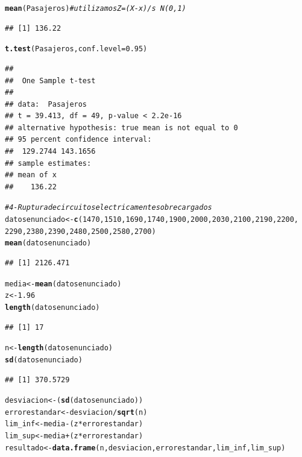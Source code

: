 \documentclass{article}\usepackage[]{graphicx}\usepackage[]{color}
\makeatletter
\newcommand{\hlnum}[1]{\textcolor[rgb]{0.686,0.059,0.569}{#1}}%
\newcommand{\hlcom}[1]{\textcolor[rgb]{0.678,0.584,0.686}{\textit{#1}}}%
\newcommand{\hlopt}[1]{\textcolor[rgb]{0,0,0}{#1}}%
\newcommand{\hlstd}[1]{\textcolor[rgb]{0.345,0.345,0.345}{#1}}%
\newcommand{\hlkwb}[1]{\textcolor[rgb]{0.69,0.353,0.396}{#1}}%
\newcommand{\hlkwc}[1]{\textcolor[rgb]{0.333,0.667,0.333}{#1}}%
\newcommand{\hlkwd}[1]{\textcolor[rgb]{0.737,0.353,0.396}{\textbf{#1}}}%
\newenvironment{kframe}{%
 \def\at@end@of@kframe{}%
 \ifinner\ifhmode%
  \def\at@end@of@kframe{\end{minipage}}%
  \begin{minipage}{\columnwidth}%
 \fi\fi%
 \def\FrameCommand##1{\hskip\@totalleftmargin \hskip-\fboxsep
 \colorbox{shadecolor}{##1}\hskip-\fboxsep
     \hskip-\linewidth \hskip-\@totalleftmargin \hskip\columnwidth}%
 \MakeFramed {\advance\hsize-\width
   \@totalleftmargin\z@ \linewidth\hsize
   \@setminipage}}%
 {\par\unskip\endMakeFramed%
 \at@end@of@kframe}
\newenvironment{knitrout}{}{} %
\makeatother
\begin{document}
\begin{knitrout}
\begin{kframe}
\begin{alltt}
\hlkwd{mean}\hlstd{(Pasajeros)} \hlcom{# utilizamos Z= (X-x)/s ~N(0,1)}
\end{alltt}
\begin{verbatim}
## [1] 136.22
\end{verbatim}
\begin{alltt}
\hlkwd{t.test}\hlstd{(Pasajeros,}\hlkwc{conf.level} \hlstd{=} \hlnum{0.95}\hlstd{)}
\end{alltt}
\begin{verbatim}
## 
## 	One Sample t-test
## 
## data:  Pasajeros
## t = 39.413, df = 49, p-value < 2.2e-16
## alternative hypothesis: true mean is not equal to 0
## 95 percent confidence interval:
##  129.2744 143.1656
## sample estimates:
## mean of x 
##    136.22
\end{verbatim}
\begin{alltt}
\hlcom{# 4 - Ruptura de circuitos electricamente sobrecargados}
\hlstd{datosenunciado}\hlkwb{<-}\hlkwd{c}\hlstd{(}\hlnum{1470}\hlstd{,} \hlnum{1510}\hlstd{,} \hlnum{1690}\hlstd{,} \hlnum{1740}\hlstd{,} \hlnum{1900}\hlstd{,} \hlnum{2000}\hlstd{,} \hlnum{2030}\hlstd{,} \hlnum{2100}\hlstd{,} \hlnum{2190}\hlstd{,} \hlnum{2200}\hlstd{,}
                  \hlnum{2290}\hlstd{,} \hlnum{2380}\hlstd{,} \hlnum{2390}\hlstd{,}  \hlnum{2480}\hlstd{,} \hlnum{2500}\hlstd{,} \hlnum{2580}\hlstd{,} \hlnum{2700}\hlstd{)}
\hlkwd{mean}\hlstd{(datosenunciado)}
\end{alltt}
\begin{verbatim}
## [1] 2126.471
\end{verbatim}
\begin{alltt}
\hlstd{media}\hlkwb{<-}\hlkwd{mean}\hlstd{(datosenunciado)}
\hlstd{z}\hlkwb{<-} \hlnum{1.96}
\hlkwd{length}\hlstd{(datosenunciado)}
\end{alltt}
\begin{verbatim}
## [1] 17
\end{verbatim}
\begin{alltt}
\hlstd{n}\hlkwb{<-} \hlkwd{length}\hlstd{(datosenunciado)}
\hlkwd{sd}\hlstd{(datosenunciado)}
\end{alltt}
\begin{verbatim}
## [1] 370.5729
\end{verbatim}
\begin{alltt}
\hlstd{desviacion}\hlkwb{<-}\hlstd{(}\hlkwd{sd}\hlstd{(datosenunciado))}
\hlstd{errorestandar}\hlkwb{<-} \hlstd{desviacion}\hlopt{/}\hlkwd{sqrt}\hlstd{(n)}
\hlstd{lim_inf}\hlkwb{<-}\hlstd{media}\hlopt{-}\hlstd{(z}\hlopt{*}\hlstd{errorestandar)}
\hlstd{lim_sup}\hlkwb{<-}\hlstd{media}\hlopt{+}\hlstd{(z}\hlopt{*}\hlstd{errorestandar)}
\hlstd{resultado}\hlkwb{<-} \hlkwd{data.frame}\hlstd{(n, desviacion, errorestandar, lim_inf, lim_sup)}



\end{alltt}
\end{kframe}
\end{knitrout}
\end{document}
